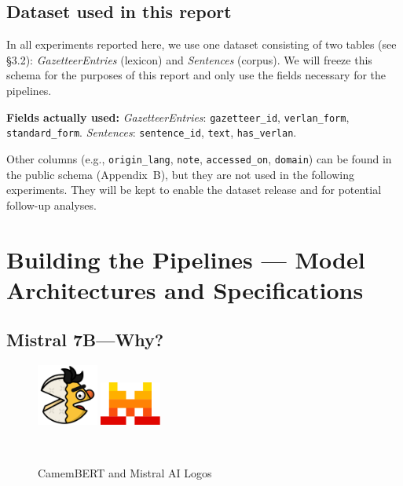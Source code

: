 \documentclass[12pt]{article}
\begin{document}
\subsection{Dataset used in this report}

In all experiments reported here, we use one dataset consisting of two tables (see §3.2): \textit{GazetteerEntries} (lexicon) and \textit{Sentences} (corpus). We will freeze this schema for the purposes of this report and only use the fields necessary for the pipelines.

\textbf{Fields actually used:} \textit{GazetteerEntries}: \texttt{gazetteer\_id}, \texttt{verlan\_form}, \texttt{standard\_form}. \; \textit{Sentences}: \texttt{sentence\_id}, \texttt{text}, \texttt{has\_verlan}.

Other columns (e.g., \texttt{origin\_lang}, \texttt{note}, \texttt{accessed\_on}, \texttt{domain}) can be found in the public schema (Appendix~B), but they are not used in the following experiments. They will be kept to enable the dataset release and for potential follow-up analyses.




\section{Building the Pipelines --- Model Architectures and Specifications}
\subsection{Mistral 7B\;---\;Why?}

\begin{figure}
  \vspace{-30pt}
  \begin{minipage}{0.49\linewidth}
    \centering
    \includegraphics[width=2cm]{figures/CamemBERT.png}
  \end{minipage}%
  \hfill
  \begin{minipage}{0.49\linewidth}
    \centering
    \includegraphics[width=2cm]{figures/mistral-logo.png}
  \end{minipage}\\[3pt]
  {\captionsetup{font=scriptsize,skip=0pt}\caption*{CamemBERT and Mistral AI Logos}}
\end{figure}
\end{document}
